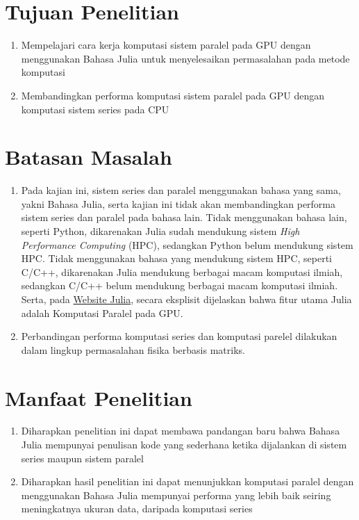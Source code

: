 \section{Tujuan Penelitian}
\begin{enumerate}
	\item Mempelajari cara kerja komputasi sistem paralel pada GPU dengan menggunakan Bahasa Julia
	      untuk menyelesaikan permasalahan pada metode komputasi

	\item Membandingkan performa komputasi sistem paralel pada GPU dengan komputasi sistem series pada CPU
\end{enumerate}

\section{Batasan Masalah}
\begin{enumerate}
	\item Pada kajian ini, sistem series dan paralel menggunakan bahasa yang sama, yakni
	      Bahasa Julia, serta kajian ini tidak akan membandingkan performa sistem series
	      dan paralel pada bahasa lain. Tidak menggunakan bahasa lain, seperti Python, dikarenakan Julia sudah mendukung sistem \emph{High Performance Computing} (HPC), sedangkan Python belum mendukung sistem HPC. Tidak menggunakan bahasa yang mendukung sistem HPC, seperti C/C++, dikarenakan Julia mendukung berbagai macam komputasi ilmiah, sedangkan C/C++ belum mendukung berbagai macam komputasi ilmiah. Serta, pada \href{https://julialang.org/}{Website Julia}, secara eksplisit dijelaskan bahwa fitur utama Julia adalah Komputasi Paralel pada GPU.

	\item Perbandingan performa komputasi series dan komputasi parelel dilakukan dalam
	      lingkup permasalahan fisika berbasis matriks.
\end{enumerate}

\section{Manfaat Penelitian}
\begin{enumerate}
	\item Diharapkan penelitian ini dapat membawa pandangan baru bahwa Bahasa Julia
	      mempunyai penulisan kode yang sederhana ketika dijalankan di sistem series
	      maupun sistem paralel

	\item Diharapkan hasil penelitian ini dapat menunjukkan komputasi paralel dengan
	      menggunakan Bahasa Julia mempunyai performa yang lebih baik seiring
	      meningkatnya ukuran data, daripada komputasi series
\end{enumerate}
